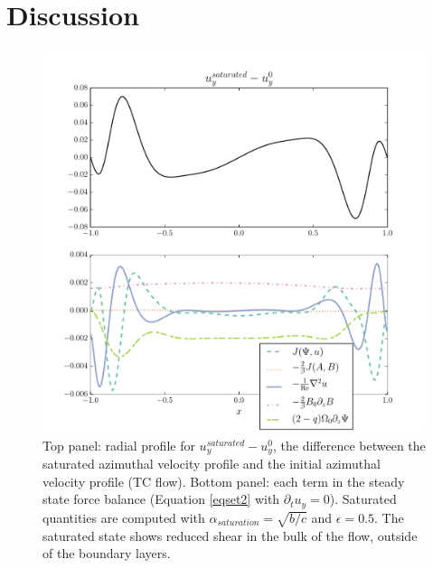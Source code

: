 \documentclass{emulateapj}
\begin{document}
\section{Discussion}
\label{sec:discussion}

\begin{figure}
\centering
\includegraphics[width=\columnwidth]{thingap_saturation_mechanism_plots_velocity_slice60.pdf}
\caption{Top panel: radial profile for $u_y^{saturated} - u_y^0$, the difference between the saturated azimuthal velocity profile and the initial azimuthal velocity profile (TC flow). Bottom panel: each term in the steady state force balance (Equation \ref{eqset2} with $\partial_t u_{y} = 0$). Saturated quantities are computed with $\alpha_{saturation} = \sqrt{b/c}$ and $\epsilon = 0.5$. The saturated state shows reduced shear in the bulk of the flow, outside of the boundary layers.} \label{fig:sat_comp_vel}
\end{figure}
\end{document}
